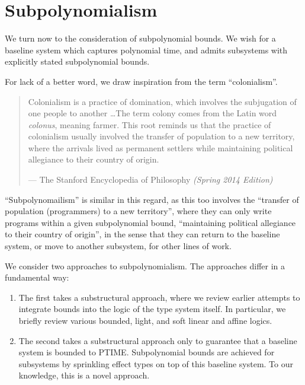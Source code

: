 \part{Subpolynomialism}

We turn now to the consideration of subpolynomial bounds. We wish for a
baseline system which captures polynomial time, and admits subsystems with
explicitly stated subpolynomial bounds.

For lack of a better word, we draw inspiration from the term ``colonialism''.

\begin{quotation}

Colonialism is a practice of domination, which involves the subjugation of one
people to another \ldots The term colony comes from the Latin word
\emph{colonus}, meaning farmer. This root reminds us that the practice of
colonialism usually involved the transfer of population to a new territory,
where the arrivals lived as permanent settlers while maintaining political
allegiance to their country of origin.

\begin{flushright}

\footnotesize\sffamily

\upshape

--- The Stanford Encyclopedia of Philosophy \itshape (Spring 2014 Edition)

\end{flushright}

\end{quotation}

``Subpolynomailism'' is similar in this regard, as this too involves the
``transfer of population (programmers) to a new territory'', where they can
only write programs within a given subpolynomial bound, ``maintaining political
allegiance to their country of origin'', in the sense that they can return to
the baseline system, or move to another subsystem, for other lines of work.

We consider two approaches to subpolynomialism. The approaches differ in a
fundamental way:

\begin{enumerate}

\item The first takes a substructural approach, where we review earlier
attempts to integrate bounds into the logic of the type system itself. In
particular, we briefly review various bounded, light, and soft linear and
affine logics.

\item The second takes a substructural approach only to guarantee that a
baseline system is bounded to PTIME. Subpolynomial bounds are achieved for
subsystems by sprinkling effect types on top of this baseline system. To our
knowledge, this is a novel approach.

\end{enumerate}




